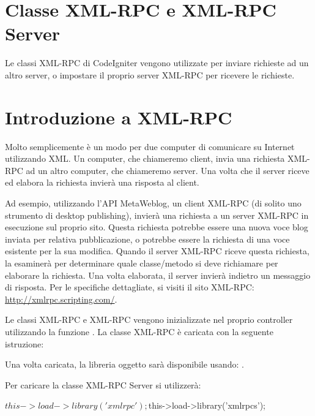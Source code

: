 \section{Classe XML-RPC e XML-RPC Server}
\label{class:xml}

Le classi XML-RPC di CodeIgniter vengono utilizzate per inviare richieste ad un altro server, o impostare il proprio server XML-RPC per ricevere le richieste.

\section*{Introduzione a XML-RPC}
Molto semplicemente è un modo per due computer di comunicare su Internet utilizzando \ac{XML}. Un computer, che chiameremo client, invia una richiesta XML-RPC ad un altro computer, che chiameremo server. Una volta che il server riceve ed elabora la richiesta invierà una risposta al client.

Ad esempio, utilizzando l'API MetaWeblog, un client XML-RPC (di solito uno strumento di desktop publishing), invierà una richiesta a un server XML-RPC in esecuzione sul proprio sito. Questa richiesta potrebbe essere una nuova voce blog inviata per relativa pubblicazione, o potrebbe essere la richiesta di una voce esistente per la sua modifica. Quando il server XML-RPC riceve questa richiesta, la esaminerà per determinare quale classe/metodo si deve richiamare per elaborare la richiesta. Una volta elaborata, il server invierà indietro un messaggio di risposta. Per le specifiche dettagliate, si visiti il sito XML-RPC: \url{http://xmlrpc.scripting.com/}.

Le classi XML-RPC e XML-RPC vengono inizializzate nel proprio controller utilizzando la funzione . La classe XML-RPC è caricata con la seguente istruzione:


Una volta caricata, la libreria oggetto sarà disponibile usando: . 

Per caricare la classe XML-RPC Server si utilizzerà:

\begin{code}
$this->load->library('xmlrpc');
$this->load->library('xmlrpcs');
\end{code}

